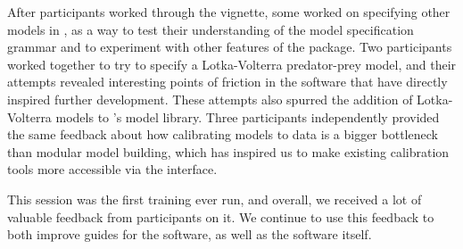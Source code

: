 After participants worked through the vignette, some worked on specifying other models in \macpan, as a way to test their understanding of the model specification grammar and to experiment with other features of the package. Two participants worked together to try to specify a Lotka-Volterra predator-prey model, and their attempts revealed interesting points of friction in the software that have directly inspired further development. These attempts also spurred the addition of Lotka-Volterra models to \macpan's model library. Three participants independently provided the same feedback about how calibrating models to data is a bigger bottleneck than modular model building, which has inspired us to make existing calibration tools more accessible via the \macpan interface.

This session was the first \macpan training ever run, and overall, we received a lot of valuable feedback from participants on it. We continue to use this feedback to both improve guides for the software, as well as the software itself.